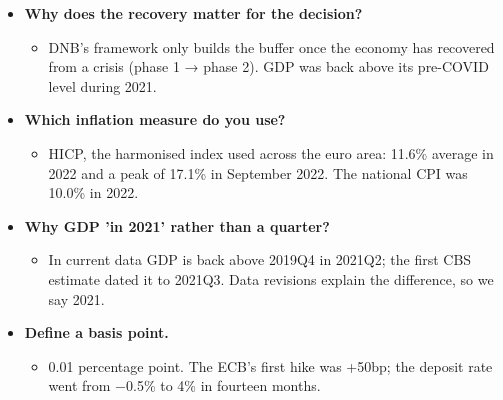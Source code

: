 \documentclass[10pt]{article}
\begin{document}
\begin{tcolorbox}[sbox,width=0.495\linewidth,height=14.6cm,nobeforeafter,box align=top,fit basedim=11pt,colframe=nlred!70,colbacktitle=nlred!8,coltitle=nlred,title=LIKELY CHALLENGES · definitions and logic]
\begin{itemize}
\item[\textcolor{navy}{\textbf{Q}}] \textbf{Why does the recovery matter for the decision?}
\begin{itemize}
\item DNB's framework only builds the buffer once the economy has recovered from a crisis (phase 1 → phase 2). GDP was back above its pre-COVID level during 2021.
\end{itemize}
\item[\textcolor{navy}{\textbf{Q}}] \textbf{Which inflation measure do you use?}
\begin{itemize}
\item HICP, the harmonised index used across the euro area: 11.6\% average in 2022 and a peak of 17.1\% in September 2022. The national CPI was 10.0\% in 2022.
\end{itemize}
\item[\textcolor{navy}{\textbf{Q}}] \textbf{Why GDP 'in 2021' rather than a quarter?}
\begin{itemize}
\item In current data GDP is back above 2019Q4 in 2021Q2; the first CBS estimate dated it to 2021Q3. Data revisions explain the difference, so we say 2021.
\end{itemize}
\item[\textcolor{navy}{\textbf{Q}}] \textbf{Define a basis point.}
\begin{itemize}
\item 0.01 percentage point. The ECB's first hike was +50bp; the deposit rate went from −0.5\% to 4\% in fourteen months.
\end{itemize}
\end{itemize}
\end{tcolorbox}
\newpage
\end{document}
